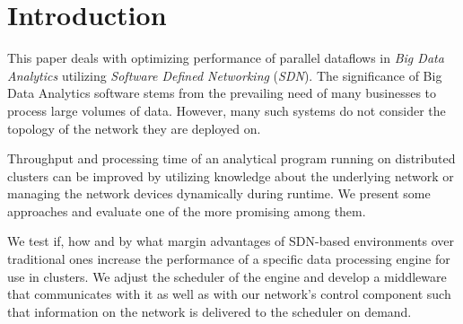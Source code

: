 \section{Introduction}
This paper deals with optimizing performance of parallel dataflows in \textit{Big Data Analytics}
utilizing \textit{Software Defined Networking} (\textit{SDN}). The significance of Big Data
Analytics software stems from the prevailing need of many businesses to process large volumes of
data. However, many such systems do not consider the topology of the network they are deployed on.

Throughput and processing time of an analytical program running on distributed clusters can be
improved by utilizing knowledge about the underlying network or managing the network devices
dynamically during runtime. We present some approaches and evaluate one of the more promising among
them.

We test if, how and by what margin advantages of SDN-based environments over traditional ones
increase the performance of a specific data processing engine for use in clusters. We adjust the
scheduler of the engine and develop a middleware that communicates with it as well as with our
network's control component such that information on the network is delivered to the scheduler on
demand.
